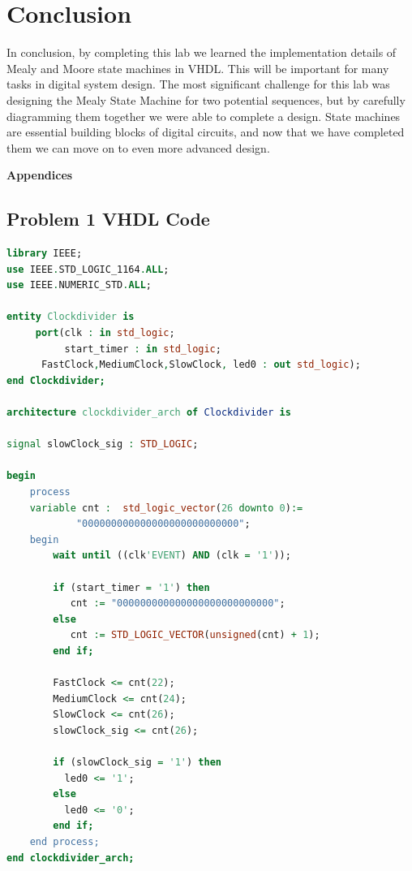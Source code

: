 \documentclass[11pt]{article}
\begin{document}
\section{Conclusion}
In conclusion, by completing this lab we learned the implementation details of Mealy and Moore state machines in VHDL. This will be important for many tasks in digital system design. The most significant challenge for this lab was designing the Mealy State Machine for two potential sequences, but by carefully diagramming them together we were able to complete a design. State machines are essential building blocks of digital circuits, and now that we have completed them we can move on to even more advanced design.

\pagebreak

\textbf{Appendices}

\begin{appendices}

\section{Problem 1 VHDL Code}

\begin{lstlisting}[language=VHDL]
library IEEE;
use IEEE.STD_LOGIC_1164.ALL;
use IEEE.NUMERIC_STD.ALL;

entity Clockdivider is
     port(clk : in std_logic;
          start_timer : in std_logic;
	  FastClock,MediumClock,SlowClock, led0 : out std_logic);
end Clockdivider;

architecture clockdivider_arch of Clockdivider is

signal slowClock_sig : STD_LOGIC;

begin
    process  
    variable cnt :	std_logic_vector(26 downto 0):= 
    		"000000000000000000000000000";
    begin					 
        wait until ((clk'EVENT) AND (clk = '1'));
	       
		if (start_timer = '1') then
	       cnt := "000000000000000000000000000";
	    else  
           cnt := STD_LOGIC_VECTOR(unsigned(cnt) + 1);
	    end if;

   	    FastClock <= cnt(22);
   	    MediumClock <= cnt(24);	
   	    SlowClock <= cnt(26);
        slowClock_sig <= cnt(26);
	
        if (slowClock_sig = '1') then
		  led0 <= '1';
	    else
		  led0 <= '0';
	    end if;
	end process;
end clockdivider_arch;
\end{lstlisting}


\end{appendices}
\end{document}
